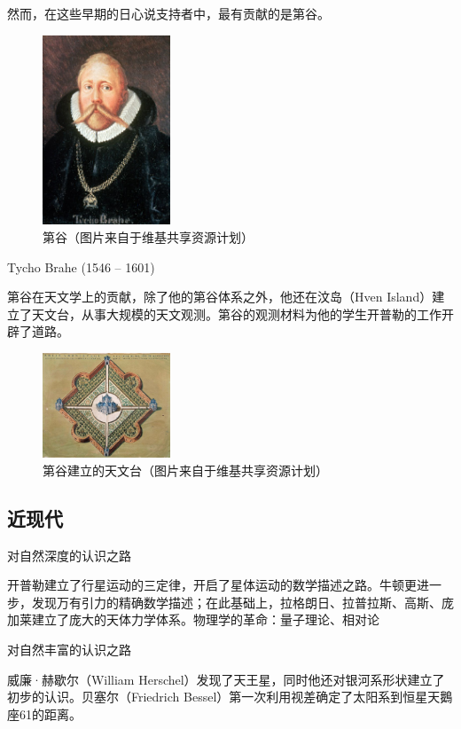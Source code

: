 \documentclass[a4paper,10.5pt]{article}
\begin{document}
然而，在这些早期的日心说支持者中，最有贡献的是第谷。

\begin{figure}[ht]
\centering
\includegraphics[width=1.5in]{images/1_08-Tycho_Brahe.jpg}
\caption{第谷（图片来自于维基共享资源计划）}
\end{figure}

Tycho Brahe (1546 – 1601)

第谷在天文学上的贡献，除了他的第谷体系之外，他还在汶岛（Hven Island）建立了天文台，从事大规模的天文观测。第谷的观测材料为他的学生开普勒的工作开辟了道路。

\begin{figure}[ht]
\centering
\includegraphics[width=1.5in]{images/1_09-Uraniborgskiss.jpg}
\caption{第谷建立的天文台（图片来自于维基共享资源计划）}
\end{figure}

\newpage

\subsection{近现代}

对自然深度的认识之路

开普勒建立了行星运动的三定律，开启了星体运动的数学描述之路。牛顿更进一步，发现万有引力的精确数学描述；在此基础上，拉格朗日、拉普拉斯、高斯、庞加莱建立了庞大的天体力学体系。物理学的革命：量子理论、相对论

对自然丰富的认识之路

威廉·赫歇尔（William Herschel）发现了天王星，同时他还对银河系形状建立了初步的认识。贝塞尔（Friedrich Bessel）第一次利用视差确定了太阳系到恒星天鵝座61的距离。
\end{document}
